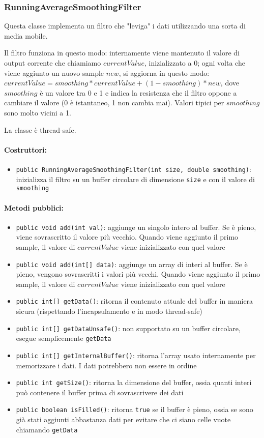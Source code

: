 \subsubsection{RunningAverageSmoothingFilter}
Questa classe implementa un filtro che "leviga" i dati utilizzando una sorta di media mobile.

Il filtro funziona in questo modo: internamente viene mantenuto il valore di output corrente che chiamiamo $currentValue$, inizializzato a 0; ogni volta che viene aggiunto un nuovo sample $new$, si aggiorna in questo modo: $currentValue=smoothing*currentValue+(1-smoothing)*new$, dove $smoothing$ è un valore tra 0 e 1 e indica la resistenza che il filtro oppone a cambiare il valore (0 è istantaneo, 1 non cambia mai). Valori tipici per $smoothing$ sono molto vicini a 1.

La classe è thread-safe.

\paragraph{Costruttori:} \begin{itemize}
	\item \texttt{public RunningAverageSmoothingFilter(int size, double smoothing)}: inizializza il filtro su un buffer circolare di dimensione \texttt{size} e con il valore di \texttt{smoothing}
\end{itemize}

\paragraph{Metodi pubblici:} \begin{itemize}
	\item \texttt{public void add(int val)}: aggiunge un singolo intero al buffer. Se è pieno, viene sovrascritto il valore più vecchio. Quando viene aggiunto il primo sample, il valore di $currentValue$ viene inizializzato con quel valore
	\item \texttt{public void add(int[] data)}: aggiunge un array di interi al buffer. Se è pieno, vengono sovrascritti i valori più vecchi. Quando viene aggiunto il primo sample, il valore di $currentValue$ viene inizializzato con quel valore
	\item \texttt{public int[] getData()}: ritorna il contenuto attuale del buffer in maniera sicura (rispettando l'incapsulamento e in modo thread-safe)
	\item \texttt{public int[] getDataUnsafe()}: non supportato su un buffer circolare, esegue semplicemente \texttt{getData}
	\item \texttt{public int[] getInternalBuffer()}: ritorna l'array usato internamente per memorizzare i dati. I dati potrebbero non essere in ordine
	\item \texttt{public int getSize()}: ritorna la dimensione del buffer, ossia quanti interi può contenere il buffer prima di sovrascrivere dei dati
	\item \texttt{public boolean isFilled()}: ritorna \texttt{true} se il buffer è pieno, ossia se sono già stati aggiunti abbastanza dati per evitare che ci siano celle vuote chiamando \texttt{getData}
\end{itemize}

